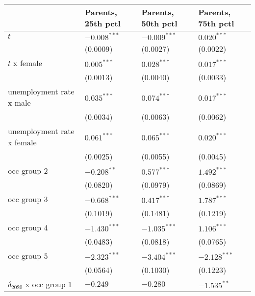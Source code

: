 \begin{tabular}{llll}
\toprule
{} & Parents, 25th pctl & Parents, 50th pctl & Parents, 75th pctl \\
\midrule
$t$                                    &     $-0.008^{***}$ &     $-0.009^{***}$ &      $0.020^{***}$ \\
                                       &           (0.0009) &           (0.0027) &           (0.0022) \\
$t$ x female                           &      $0.005^{***}$ &      $0.028^{***}$ &      $0.017^{***}$ \\
                                       &           (0.0013) &           (0.0040) &           (0.0033) \\
unemployment rate x male               &      $0.035^{***}$ &      $0.074^{***}$ &      $0.017^{***}$ \\
                                       &           (0.0034) &           (0.0063) &           (0.0062) \\
unemployment rate x female             &      $0.061^{***}$ &      $0.065^{***}$ &      $0.020^{***}$ \\
                                       &           (0.0025) &           (0.0055) &           (0.0045) \\
occ group 2                            &      $-0.208^{**}$ &      $0.577^{***}$ &      $1.492^{***}$ \\
                                       &           (0.0820) &           (0.0979) &           (0.0869) \\
occ group 3                            &     $-0.668^{***}$ &      $0.417^{***}$ &      $1.787^{***}$ \\
                                       &           (0.1019) &           (0.1481) &           (0.1219) \\
occ group 4                            &     $-1.430^{***}$ &     $-1.035^{***}$ &      $1.106^{***}$ \\
                                       &           (0.0483) &           (0.0818) &           (0.0765) \\
occ group 5                            &     $-2.323^{***}$ &     $-3.404^{***}$ &     $-2.128^{***}$ \\
                                       &           (0.0564) &           (0.1030) &           (0.1223) \\
$\delta_{2020}$ x occ group 1          &           $-0.249$ &           $-0.280$ &      $-1.535^{**}$ \\

\end{tabular}
